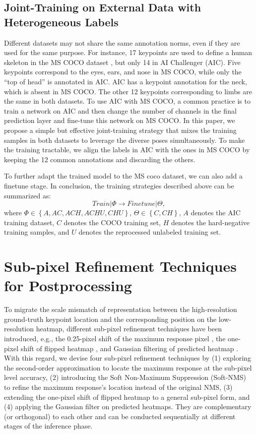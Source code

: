 \documentclass[twocolumn]{svjour3}          \smartqed  \usepackage{natbib}
\begin{document}
\subsection{Joint-Training on External Data with Heterogeneous Labels}
\label{subsec:jointtraining}
Different datasets may not share the same annotation norms, even if they are used for the same purpose. For instance, 17 keypoints are used to define a human skeleton in the MS COCO dataset \citep{lin2014microsoft}, but only 14 in AI Challenger (AIC). Five keypoints correspond to the eyes, ears, and nose in MS COCO, while only the ``top of head'' is annotated in AIC. AIC has a keypoint annotation for the neck, which is absent in MS COCO. The other 12 keypoints corresponding to limbs are the same in both datasets. To use AIC with MS COCO, a common practice is to train a network on AIC and then change the number of channels in the final prediction layer and fine-tune this network on MS COCO. In this paper, we propose a simple but effective joint-training strategy that mixes the training samples in both datasets to leverage the diverse poses simultaneously. To make the training tractable, we align the labels in AIC with the ones in MS COCO by keeping the 12 common annotations and discarding the others.

To further adapt the trained model to the MS coco dataset, we can also add a finetune stage. In conclusion, the training strategies described above can be summarized as:
\begin{equation}
Train\left| \Phi  \right. \to Finetune\left| \Theta  \right.,
\label{eq:finetue}
\end{equation}
where $\Phi  \in \left\{ {A,AC,ACH,ACHU,CHU} \right\}$, $\Theta  \in \left\{ {C,CH} \right\}$, $A$ denotes the AIC training dataset, $C$ denotes the COCO training set, $H$ denotes the hard-negative training samples, and $U$ denotes the reprocessed unlabeled training set.

\section{Sub-pixel Refinement Techniques for Postprocessing}
\label{sec:subpixelrefinement}
To migrate the scale mismatch of representation between the high-resolution ground-truth keypoint location and the corresponding position on the low-resolution heatmap, different sub-pixel refinement techniques have been introduced, e.g., the 0.25-pixel shift of the maximum response pixel \citep{chen2018cascaded,xiao2018simple,sun2019deep,li2019rethinking}, the one-pixel shift of flipped heatmap \citep{xiao2018simple,sun2019deep}, and Gaussian filtering of predicted heatmap \citep{chen2018cascaded,li2019rethinking}. With this regard, we devise four sub-pixel refinement techniques by (1) exploring the second-order approximation to locate the maximum response at the sub-pixel level accuracy, (2) introducing the Soft Non-Maximum Suppression (Soft-NMS) to refine the maximum response's location instead of the original NMS, (3) extending the one-pixel shift of flipped heatmap to a general sub-pixel form, and (4) applying the Gaussian filter on predicted heatmaps. They are complementary (or orthogonal) to each other and can be conducted sequentially at different stages of the inference phase.
\end{document}
